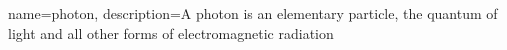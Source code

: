{
    name=photon,
    description={A photon is an elementary particle, the quantum of light and all other forms of electromagnetic radiation}
}
